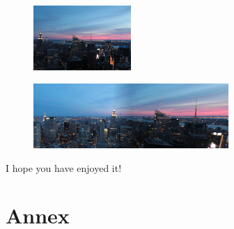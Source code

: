 \documentclass[aps,letterpaper,10pt]{revtex4}
\begin{document}
\begin{figure}[h]
	\begin{center}
		\includegraphics[width=0.33\textwidth]{imgs/rockfeller_2.JPG}
	\end{center}
\label{Second view of New York skyline.}
\end{figure}

\begin{figure}[h]
	\begin{center}
		\includegraphics[width=0.66\textwidth]{imgs/panorama.jpg}
	\end{center}
\label{Pair matching of two view of New York skyline.}
\end{figure}

I hope you have enjoyed it!

\newpage
\section{Annex}
\end{document}
